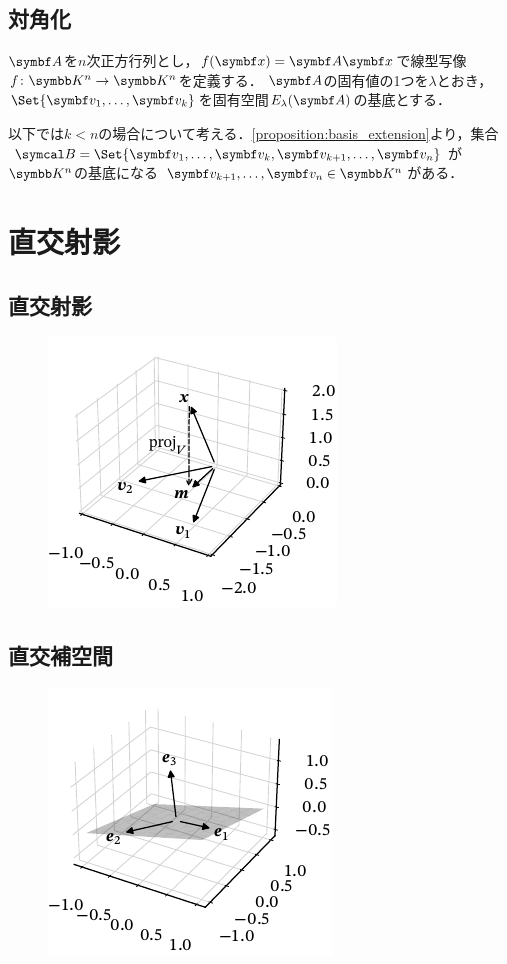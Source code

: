 \documentclass[../../main]{subfiles}
\begin{document}
\subsection{対角化}
\(\mat{A}\)を\(n\)次正方行列とし，\(f(\vect{x})=\mat{A}\vect{x}\)で線型写像\(f\colon\numset{K}^n\to\numset{K}^n\)を定義する．
\(\mat{A}\)の固有値の1つを\(\lambda\)とおき，\(\Set{\vect{v}_1,\dots,\vect{v}_k}\)を固有空間\(E_\lambda(\mat{A})\)の基底とする．

以下では\(k<n\)の場合について考える．\cref{proposition:basis_extension}より，集合\(\basis{B}=\Set{\vect{v}_1,\dots,\vect{v}_k,\vect{v}_{k+1},\dots,\vect{v}_n}\)が\(\numset{K}^n\)の基底になる
\(\vect{v}_{k+1},\dots,\vect{v}_n\in\numset{K}^n\)がある．

\section{直交射影}
\subsection{直交射影}
\begin{figure}[htbp]
  \centering
  \includegraphics{projection.pdf}
\end{figure}

\subsection{直交補空間}
\begin{figure}[htbp]
  \centering
  \includegraphics{orthogonal_complement.pdf}
\end{figure}
\end{document}
